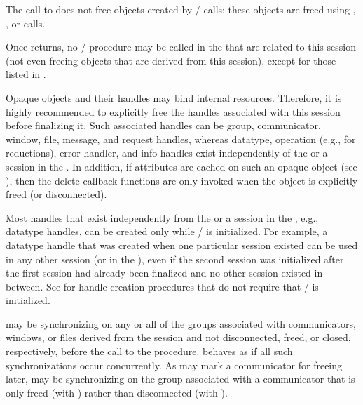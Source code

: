The call to  does not free objects created by
\MPI/ calls; these objects are freed using
%
%
%
%
%
%
%
%
,
, or
 calls.

Once  returns, no \MPI/ procedure may be called in the \spm{} that are related to this session
(not even freeing objects that are derived from this session),
except for those listed in .

\begin{users}
Opaque objects and their handles may bind internal resources.
Therefore, it is highly recommended to explicitly free the handles associated with this session before finalizing it.
Such associated handles can be group, communicator, window, file, message, and request handles,
whereas datatype, operation (e.g., for reductions), error handler, and info handles exist independently
of the \wpm{} or a session in the \spm{}.
In addition, if attributes are cached on such an opaque object (see ),
then the delete callback functions are only invoked when the object is explicitly freed (or disconnected).
\end{users}

Most handles that exist independently from the \wpm{} or a session in the \spm{}, e.g., datatype handles,
can be created only while \MPI/ is initialized.
For example, a datatype handle that was created when one particular session existed
can be used in any other session (or in the \wpm{}), even if the second session
was initialized after the first session had already been finalized
and no other session existed in between.
See  for handle creation procedures that do not require that \MPI/ is initialized.

 may be synchronizing on any or all of the groups associated with
communicators, windows, or files derived from the session and not disconnected, freed, or closed,
respectively, before the call to the  procedure.
 behaves as if all such synchronizations occur concurrently.
As  may mark a communicator for freeing later,
 may be synchronizing on the group associated
with a communicator that is only freed (with )
rather than disconnected (with ).

